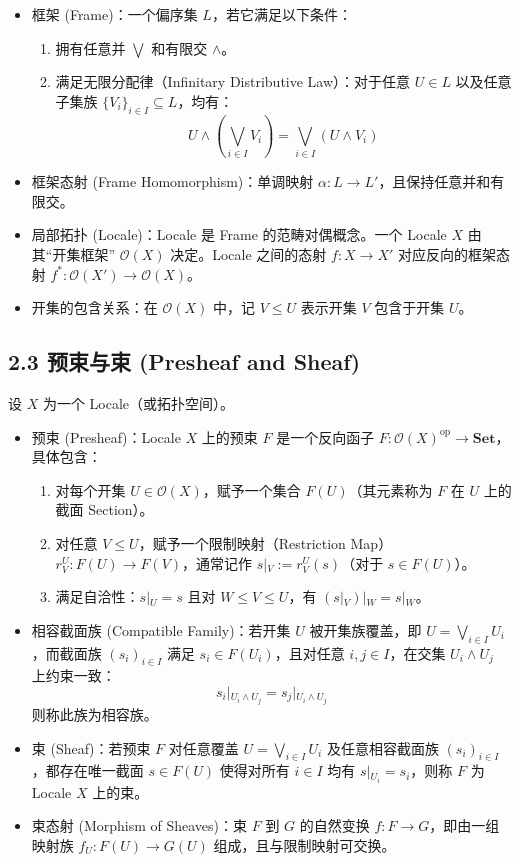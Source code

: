 \documentclass[12pt,a4paper]{article}
\begin{document}
\begin{itemize}
  \item 框架 (Frame)：一个偏序集 $L$，若它满足以下条件：
  \begin{enumerate}
    \item 拥有任意并 $\bigvee$ 和有限交 $\wedge$。
    \item 满足无限分配律（Infinitary Distributive Law）：对于任意 $U \in L$ 以及任意子集族 $\{V_i\}_{i \in I} \subseteq L$，均有：
    \[
    U \wedge \left( \bigvee_{i \in I} V_i \right) = \bigvee_{i \in I} (U \wedge V_i)
    \]
  \end{enumerate}
  \item 框架态射 (Frame Homomorphism)：单调映射 $\alpha: L \to L'$，且保持任意并和有限交。
  \item 局部拓扑 (Locale)：Locale 是 Frame 的范畴对偶概念。一个 Locale $X$ 由其“开集框架” $\mathcal{O}(X)$ 决定。Locale 之间的态射 $f: X \to X'$ 对应反向的框架态射 $f^*: \mathcal{O}(X') \to \mathcal{O}(X)$。
  \item 开集的包含关系：在 $\mathcal{O}(X)$ 中，记 $V \le U$ 表示开集 $V$ 包含于开集 $U$。
\end{itemize}

\subsection{2.3 预束与束 (Presheaf and Sheaf)}

设 $X$ 为一个 Locale（或拓扑空间）。

\begin{itemize}
  \item 预束 (Presheaf)：Locale $X$ 上的预束 $F$ 是一个反向函子 $F: \mathcal{O}(X)^{\text{op}} \to \mathbf{Set}$，具体包含：
  \begin{enumerate}
    \item 对每个开集 $U \in \mathcal{O}(X)$，赋予一个集合 $F(U)$（其元素称为 $F$ 在 $U$ 上的截面 Section）。
    \item 对任意 $V \le U$，赋予一个限制映射（Restriction Map） $r_V^U: F(U) \to F(V)$，通常记作 $s\vert{}_V := r_V^U(s)$（对于 $s \in F(U)$）。
    \item 满足自洽性：$s\vert{}_U = s$ 且对 $W \le V \le U$，有 $(s\vert{}_V)\vert{}_W = s\vert{}_W$。
  \end{enumerate}
  \item 相容截面族 (Compatible Family)：若开集 $U$ 被开集族覆盖，即 $U = \bigvee_{i \in I} U_i$，而截面族 $(s_i)_{i \in I}$ 满足 $s_i \in F(U_i)$，且对任意 $i, j \in I$，在交集 $U_i \wedge U_j$ 上约束一致：
  \[
  s_i\vert{}_{U_i \wedge U_j} = s_j\vert{}_{U_i \wedge U_j}
  \]
  则称此族为相容族。
  \item 束 (Sheaf)：若预束 $F$ 对任意覆盖 $U = \bigvee_{i \in I} U_i$ 及任意相容截面族 $(s_i)_{i \in I}$，都存在唯一截面 $s \in F(U)$ 使得对所有 $i \in I$ 均有 $s\vert{}_{U_i} = s_i$，则称 $F$ 为 Locale $X$ 上的束。
  \item 束态射 (Morphism of Sheaves)：束 $F$ 到 $G$ 的自然变换 $f: F \to G$，即由一组映射族 $f_U: F(U) \to G(U)$ 组成，且与限制映射可交换。
\end{itemize}
\end{document}
